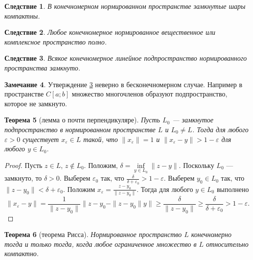\documentclass[12pt, titlepage, oneside]{amsbook}
\newtheorem{theorem}{Теорема}[chapter]
\newtheorem{corollary}[theorem]{Следствие}
\theoremstyle{definition}
\newtheorem{remark}[theorem]{Замечание}
\theoremstyle{remark}
\begin{document}
\begin{corollary}
\label{Nor3}
В конечномерном нормированном пространстве замкнутые шары компактны.
\end{corollary}

\begin{corollary}
\label{Nor4}
Любое конечномерное нормированное вещественное или комплексное пространство полно.
\end{corollary}

\begin{corollary}
\label{Nor5}
Всякое конечномерное линейное подпространство нормированного пространства замкнуто.
\end{corollary}

\begin{remark}
Утверждение \ref{Nor5} неверно в бесконечномерном случае. Например в пространстве $C[a;b]$ множество многочленов образуют подпространство, которое не замкнуто.
\end{remark}


\begin{theorem}[лемма о почти перпендикуляре]
\label{Nor6}
Пусть $L_0$ --- замкнутое подпространство в нормированном пространстве $L$ и $L_0\neq L$. Тогда для любого $\varepsilon>0$ существует $x_{\varepsilon}\in L$ такой, что $\|x_{\varepsilon}\|=1$ и $\|x_{\varepsilon}-y\|> 1-\varepsilon$ для любого $y\in L_0$.
\end{theorem}

\begin{proof}
Пусть $z\in L$, $z\not\in L_0$. Положим, $\delta=\inf\limits_{y\in L_0}\|z-y\|.$ Поскольку $L_0$ --- замкнуто, то $\delta>0$. Выберем $\varepsilon_0$ так, что $\frac{\delta}{\delta+\varepsilon_0}>1-\varepsilon$. Выберем $y_0\in L_0$ так, что $\|z-y_0\|<\delta+\varepsilon_0$. Положим $x_{\varepsilon}=\frac{z-y_0}{\|z-y_0\|}$. Тогда для любого $y\in L_0$ выполнено $$\|x_{\varepsilon}-y\|=\frac{1}{\|z-y_0\|}\|z-y_0-\|z-y_0\|y\|\geq\frac{\delta}{\|z-y_0\|}\geq\frac{\delta}{\delta+\varepsilon_0}>1-\varepsilon.$$
\end{proof}

\begin{theorem}[теорема Рисса]
\label{Nor7}
Нормированное пространство $L$ конечномерно тогда и только тогда, когда любое ограниченное множество в $L$ относительно компактно.
\end{theorem}
\end{document}
